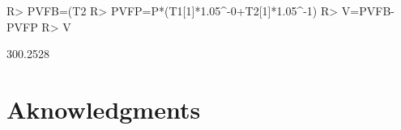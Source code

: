 \documentclass[nojss]{jss}
\begin{document}
\begin{Schunk}
\begin{Sinput}
R> PVFB=(T2%
R> PVFP=P*(T1[1]*1.05^-0+T2[1]*1.05^-1)
R> V=PVFB-PVFP
R> V
\end{Sinput}
\begin{Soutput}
         [,1]
[1,] 300.2528
\end{Soutput}
\end{Schunk}


\section{Aknowledgments}\label{sec:aknowledgements}




\end{document}
